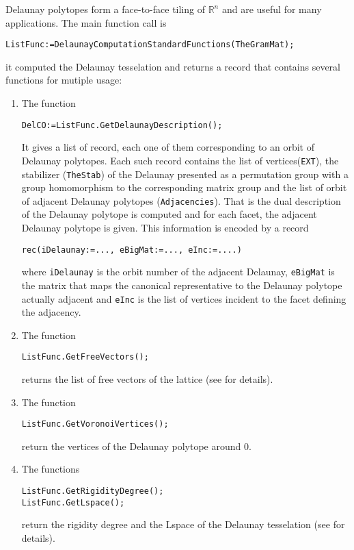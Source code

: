 \documentclass[12pt]{amsart}
\newcommand{\RR}{\ensuremath{\mathbb{R}}}
\begin{document}
Delaunay polytopes form a face-to-face tiling of $\RR^n$
and are useful for many applications.
The main function call is
\begin{verbatim}
ListFunc:=DelaunayComputationStandardFunctions(TheGramMat);
\end{verbatim}
it computed the Delaunay tesselation and returns a record
that contains several functions for mutiple usage:
\begin{enumerate}
\item The function
\begin{verbatim}
DelCO:=ListFunc.GetDelaunayDescription();
\end{verbatim}
It gives a list of record, each one of them corresponding to an orbit
of Delaunay polytopes.
Each such record contains the list of vertices({\tt EXT}),
the stabilizer ({\tt TheStab}) of the Delaunay presented
as a permutation group with a group homomorphism to
the corresponding matrix group and the list of orbit of adjacent
Delaunay polytopes ({\tt Adjacencies}).
That is the dual description of the Delaunay polytope is computed and
for each facet, the adjacent Delaunay polytope is given.
This information is encoded by a record
\begin{verbatim}
rec(iDelaunay:=..., eBigMat:=..., eInc:=....)
\end{verbatim}
where {\tt iDelaunay} is the orbit number of the adjacent Delaunay,
{\tt eBigMat} is the matrix that maps the canonical representative to
the Delaunay polytope actually adjacent and {\tt eInc} is the list of
vertices incident to the facet defining the adjacency.

\item The function
\begin{verbatim}
ListFunc.GetFreeVectors();
\end{verbatim}
returns the list of free vectors of the lattice (see \cite{free} for details).

\item The function
\begin{verbatim}
ListFunc.GetVoronoiVertices();
\end{verbatim}
return the vertices of the Delaunay polytope around $0$.

\item The functions
\begin{verbatim}
ListFunc.GetRigidityDegree();
ListFunc.GetLspace();
\end{verbatim}
return the rigidity degree and the Lspace of the Delaunay tesselation (see \cite{rigidity} for details).


\end{enumerate}
\end{document}
